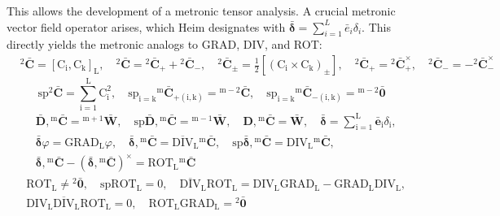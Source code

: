 \documentclass[12pt]{article}
\begin{document}
This allows the development of a metronic tensor analysis. A crucial metronic vector field operator arises, which Heim designates with \( \bar{\bm{\delta}} = \sum_{i=1}^L \bar{e}_i \delta_i \). This directly yields the metronic analogs to GRAD, DIV, and ROT:
\begin{equation}
\begin{aligned}
& {}^2\bar{\mathbf{C}} = \left[ \mathrm{C_i}, \mathrm{C_k} \right]_\mathrm{L}, \quad {}^2\bar{\mathbf{C}} = {}^2\bar{\mathbf{C}}_+ + {}^2\bar{\mathbf{C}}_-, \quad {}^2\bar{\mathbf{C}}_\pm = \frac{1}{2} \left[ (\mathrm{C_i} \times \mathrm{C_k})_\pm \right], \quad {}^2\bar{\mathbf{C}}_+ = {}^2\bar{\mathbf{C}}_+^\times, \quad {}^2\bar{\mathbf{C}}_- = -{}^2\bar{\mathbf{C}}_-^\times
\end{aligned} \tag{79}
\end{equation}
\begin{equation}
\mathrm{sp} {}^2\bar{\mathbf{C}} = \sum_{\mathrm{i}=1}^\mathrm{L} \mathrm{C}_\mathrm{i}^2, \quad \mathrm{sp}_{\mathrm{i=k}} {}^\mathrm{m}\bar{\mathbf{C}}_{+(\mathrm{i,k})} = {}^{\mathrm{m}-2}\bar{\mathbf{C}}, \quad \mathrm{sp}_{\mathrm{i=k}} {}^\mathrm{m}\bar{\mathbf{C}}_{-(\mathrm{i,k})} = {}^{\mathrm{m}-2}\bar{\mathbf{0}} \tag{79a}
\end{equation}
\begin{equation}
\begin{aligned}
& \bar{\mathbf{D}}, {}^\mathrm{m}\bar{\mathbf{C}} = {}^{\mathrm{m+1}}\bar{\mathbf{W}}, \quad \mathrm{sp} \bar{\mathbf{D}}, {}^\mathrm{m}\bar{\mathbf{C}} = {}^{\mathrm{m-1}}\bar{\mathbf{W}}, \quad \mathbf{D}, {}^\mathrm{m}\bar{\mathbf{C}} = \bar{\mathbf{W}}, \quad \bar{\bm{\delta}} = \sum_{\mathrm{i}=1}^\mathrm{L} \bar{\mathbf{e}}_\mathrm{i} \delta_\mathrm{i}, \\
& \bar{\bm{\delta}}\varphi = \mathrm{GRAD}_\mathrm{L} \varphi, \quad \bar{\bm{\delta}}, {}^\mathrm{m}\bar{\mathbf{C}} = \overline{\mathrm{DIV}}_\mathrm{L} {}^\mathrm{m}\bar{\mathbf{C}}, \quad \mathrm{sp} \bar{\bm{\delta}}, {}^\mathrm{m}\bar{\mathbf{C}} = \mathrm{DIV}_\mathrm{L} {}^\mathrm{m}\bar{\mathbf{C}}, \\
& \bar{\bm{\delta}}, {}^\mathrm{m}\bar{\mathbf{C}} - \left( \bar{\bm{\delta}}, {}^\mathrm{m}\bar{\mathbf{C}} \right)^\times = \mathrm{ROT}_\mathrm{L} {}^\mathrm{m}\bar{\mathbf{C}}
\end{aligned} \tag{79b}
\end{equation}
\begin{equation}
\begin{aligned}
& \mathrm{ROT}_\mathrm{L} \neq {}^2\bar{\mathbf{0}}, \quad \mathrm{sp} \mathrm{ROT}_\mathrm{L} = 0, \quad \overline{\mathrm{DIV}}_\mathrm{L} \mathrm{ROT}_\mathrm{L} = \mathrm{DIV}_\mathrm{L} \mathrm{GRAD}_\mathrm{L} - \mathrm{GRAD}_\mathrm{L} \mathrm{DIV}_\mathrm{L}, \\
& \mathrm{DIV}_\mathrm{L} \overline{\mathrm{DIV}}_\mathrm{L} \mathrm{ROT}_\mathrm{L} = 0, \quad \mathrm{ROT}_\mathrm{L} \mathrm{GRAD}_\mathrm{L} = {}^2\bar{\mathbf{0}}
\end{aligned} \tag{79c}
\end{equation}
\end{document}
